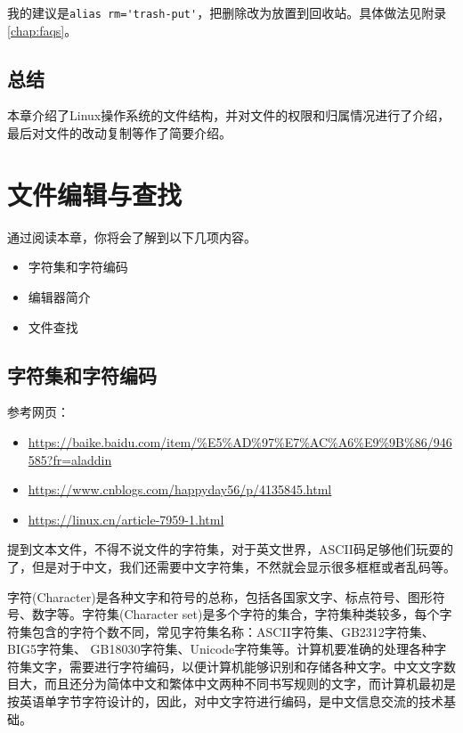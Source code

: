 \documentclass[doctor,openright,twoside]{sjtuthesis}
\providecommand{\tightlist}{%
    \setlength{\itemsep}{0pt}\setlength{\parskip}{0pt}}
\newcommand{\passthrough}[1]{#1}
\theoremstyle{plain}
\theoremstyle{definition}
\theoremstyle{remark}
\theoremstyle{ocrenumbox}
\theoremstyle{plain}
\begin{document}
我的建议是\passthrough{\lstinline!alias rm='trash-put'!}，把删除改为放置到回收站。具体做法见附录\ref{chap:faqs}。

\hypertarget{-4}{%
\section{总结}\label{-4}}

本章介绍了Linux操作系统的文件结构，并对文件的权限和归属情况进行了介绍，最后对文件的改动复制等作了简要介绍。

\hypertarget{chap:vim-find}{%
\chapter{文件编辑与查找}\label{chap:vim-find}}

通过阅读本章，你将会了解到以下几项内容。

\begin{itemize}
\tightlist
\item
  字符集和字符编码
\item
  编辑器简介
\item
  文件查找
\end{itemize}

\section{字符集和字符编码}

参考网页：

\begin{itemize}
\tightlist
\item
  \url{https://baike.baidu.com/item/\%E5\%AD\%97\%E7\%AC\%A6\%E9\%9B\%86/946585?fr=aladdin}
\item
  \url{https://www.cnblogs.com/happyday56/p/4135845.html}
\item
  \url{https://linux.cn/article-7959-1.html}
\end{itemize}

提到文本文件，不得不说文件的字符集，对于英文世界，ASCII码足够他们玩耍的了，但是对于中文，我们还需要中文字符集，不然就会显示很多框框或者乱码等。

字符(Character)是各种文字和符号的总称，包括各国家文字、标点符号、图形符号、数字等。字符集(Character
set)是多个字符的集合，字符集种类较多，每个字符集包含的字符个数不同，常见字符集名称：ASCII字符集、GB2312字符集、BIG5字符集、
GB18030字符集、Unicode字符集等。计算机要准确的处理各种字符集文字，需要进行字符编码，以便计算机能够识别和存储各种文字。中文文字数目大，而且还分为简体中文和繁体中文两种不同书写规则的文字，而计算机最初是按英语单字节字符设计的，因此，对中文字符进行编码，是中文信息交流的技术基础。
\end{document}
